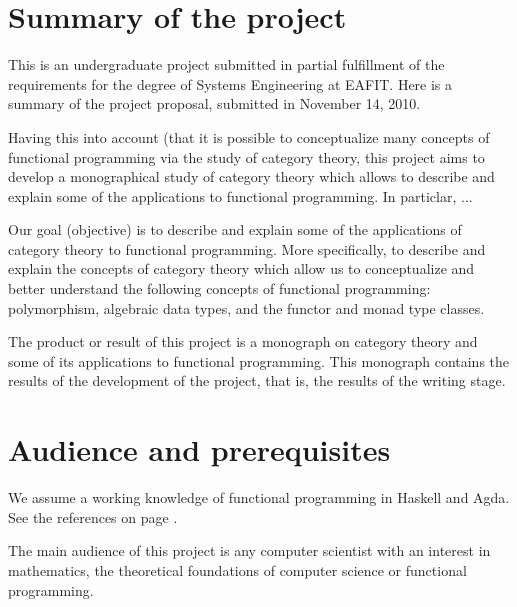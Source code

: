 \section*{Summary of the project}
\label{sec:introduction-summary}

This is an undergraduate project submitted in partial fulfillment of
the requirements for the degree of Systems Engineering at EAFIT. Here
is a summary of the project proposal, submitted in November 14, 2010.

Having this into account (that it is possible to conceptualize many
concepts of functional programming via the study of category theory,
this project aims to develop a monographical study of category theory
which allows to describe and explain some of the applications to
functional programming. In particlar, ...

Our goal (objective) is to describe and explain some of the
applications of category theory to functional programming. More
specifically, to describe and explain the concepts of category theory
which allow us to conceptualize and better understand the following
concepts of functional programming: polymorphism, algebraic data
types, and the functor and monad type classes.

The product or result of this project is a monograph on category
theory and some of its applications to functional programming. This
monograph contains the results of the development of the project, that
is, the results of the writing stage.

\section*{Audience and prerequisites}
\label{sec:introduction-prerequisites}

We assume a working knowledge of functional programming in Haskell and
Agda. See the references on page
\pageref{sec:introduction-references}.


The main audience of this project is any computer scientist with an
interest in mathematics, the theoretical foundations of computer
science or functional programming.


